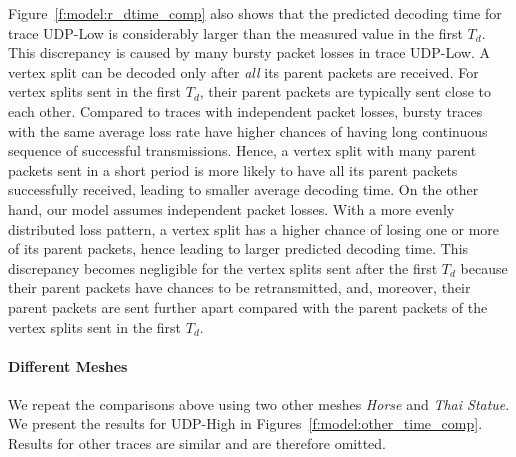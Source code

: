     Figure~\ref{f:model:r_dtime_comp} also shows that the predicted decoding time for trace \textsf{UDP-Low} is 
    considerably larger than the measured value in the first $T_d$. 
    This discrepancy is caused by many bursty packet losses in trace \textsf{UDP-Low}. 
    A vertex split %
    can be decoded only after \emph{all} its parent packets are received.
    For vertex splits sent in the first $T_d$, their parent packets
    are typically sent close to each other. Compared to traces
    with independent packet losses, 
    bursty traces with the same average loss rate have higher chances
    of having long continuous sequence of successful transmissions. 
    Hence, a vertex split with many parent packets sent in a short period is
    more likely to have all its parent packets successfully received, 
    leading to smaller average decoding time. 
    On the other hand, our model assumes independent packet losses. 
    With a more evenly distributed loss pattern,
    a vertex split has a higher chance of losing one or more of its parent
    packets, hence leading to larger predicted decoding time.
    This discrepancy becomes negligible for the vertex splits
    sent after the first $T_d$ because their parent packets have 
    chances to be retransmitted, and, moreover, their parent packets
    are sent further apart compared with the parent packets of the vertex splits sent in
    the first $T_d$. 

    \paragraph*{Different Meshes}
    We repeat the comparisons above using two other meshes
    \textit{Horse} and \textit{Thai Statue}.  We present the results
    for \textsf{UDP-High} in %
    Figures~\ref{f:model:other_time_comp}.
    Results for other traces are similar and are therefore omitted. 

